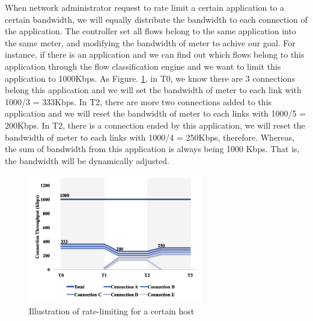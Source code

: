 \documentclass[journal]{IEEEtran}
\begin{document}
When network administrator request to rate limit a certain application to a certain bandwidth, we will equally distribute the bandwidth to each connection of the application. The controller set all flows belong to the same application into the same meter, and modifying the bandwidth of meter to achive our goal. For instance, if there is an application and we can find out which flows belong to this application through the flow classification engine and we want to limit this application to 1000Kbps. As Figure. \ref{fig:mft_qos_rate_app}, in T0, we know there are 3 connections belong this application and we will set the bandwidth of meter to each link with 1000/3 = 333Kbps. In T2, there are more two connections added to this application and we will reset the bandwidth of meter to each links with 1000/5 = 200Kbps. In T2, there is a connection ended by this application, we will reset the bandwidth of meter to each links with 1000/4 = 250Kbps, therefore. Whereas, the sum of bandwidth from this application is always being 1000 Kbps. That is, the bandwidth will be dynamically adjusted.

\begin{figure}[!t]
\centering
\includegraphics[width=3in]{./figures/mft_qos_rate_app}
\caption{Illustration of rate-limiting for a certain host}
\label{fig:mft_qos_rate_app}
\end{figure}
\end{document}
